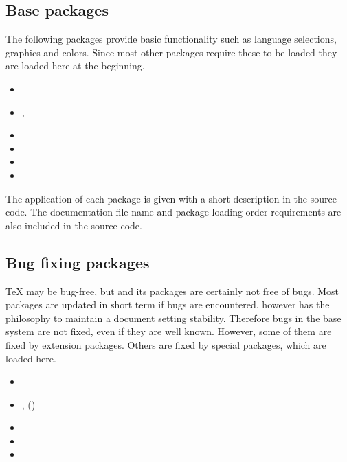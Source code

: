 \subsection{Base packages}
\label{sec:packages:base}
The following packages provide basic functionality such as language selections, graphics and colors. Since most other packages require these to be loaded they are loaded here at the beginning. 

\begin{itemize}[noitemsep]
\item {}
\item {}, 
\item {}
\item {}
\item {}
\item {}
\end{itemize}

The application of each package is given with a short description in the source code. The documentation file name and package loading order requirements are also included in the source code. 


\subsection{Bug fixing packages}

\TeX{} may be bug-free, but \latex and its packages are certainly not free of bugs.  Most packages are updated in short term if bugs are encountered. \latex however has the philosophy to maintain a document setting stability. Therefore bugs in the base \latex system are not fixed, even if they are well known. However, some of them are fixed by extension packages. Others are fixed by special packages, which are loaded here.

\begin{itemize}[noitemsep]
\item {}
\item {}, ()
\item {}
\item {}
\item {}
\end{itemize}


